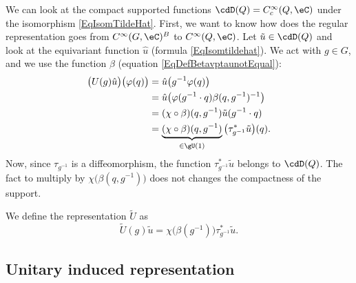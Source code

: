 We can look at the compact supported functions $\cdD(Q)= C^{\infty}_c(Q,\eC)$ under the isomorphism \eqref{EqIsomTildeHat}.  First, we want to know how does the regular representation goes from $ C^{\infty}(G,\eC)^B$ to $ C^{\infty}(Q,\eC)$. Let $\tilde u\in\cdD(Q)$ and look at the equivariant function $\hat u$ (formula \eqref{EqIsomtildehat}). We act with $g\in G$, and we use the function $\beta$ (equation \eqref{EqDefBetavptaunotEqual}):
\begin{equation}
	\begin{aligned}[]
		\big( U(g)\hat u \big)\big( \varphi(q) \big)&=\hat u\big( g^{-1}\varphi(q) \big)\\
		&=\hat u\big( \varphi(g^{-1}\cdot q)\beta(q,g^{-1})^{-1} \big)\\
		&=(\chi\circ\beta)(q,g^{-1})\tilde u(g^{-1}\cdot q)\\
		&=\underbrace{(\chi\circ\beta)(q,g^{-1})}_{\in \gU(1)}\big( \tau_{g^{-1}}^*\tilde u \big)(q).
	\end{aligned}
\end{equation}
Now, since $\tau_{g^{-1}}$ is a diffeomorphism, the function $\tau_{g^{-1}}^*\tilde u$ belongs to $\cdD(Q)$. The fact to multiply by $\chi\big( \beta(q,g^{-1}) \big)$ does not changes the compactness of the support.

We define the representation $\tilde U$ as
\begin{equation}
	\tilde U(g)\tilde u=\chi\big( \beta(g^{-1}) \big)\tau_{g^{-1}}^*\tilde u.
\end{equation}

\subsection{Unitary induced representation}
\label{SubSecUnitInducedPrep}

